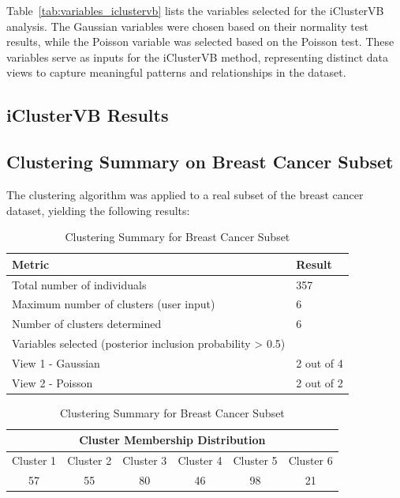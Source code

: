 Table~\ref{tab:variables_iclustervb} lists the variables selected for the iClusterVB analysis. 
The Gaussian variables were chosen based on their normality test results, while the Poisson variable was selected 
based on the Poisson test. These variables serve as inputs for the iClusterVB method, representing distinct data views 
to capture meaningful patterns and relationships in the dataset.


\subsection{iClusterVB Results}

\subsection*{Clustering Summary on Breast Cancer Subset}

The clustering algorithm was applied to a real subset of the breast cancer dataset, yielding the following results:

\begin{table}[!h]
    \centering
    \caption{Clustering Summary for Breast Cancer Subset}
    \label{tab:brca_clustering_summary}
    \begin{tabular}{ll}
    \toprule
    \textbf{Metric} & \textbf{Result} \\
    \midrule
    Total number of individuals & 357 \\
    Maximum number of clusters (user input) & 6 \\
    Number of clusters determined & 6 \\
    \midrule
    Variables selected (posterior inclusion probability > 0.5) & \\
    \quad View 1 - Gaussian & 2 out of 4 \\
    \quad View 2 - Poisson & 2 out of 2 \\
    \bottomrule
\end{tabular}
    
    \vspace{1em}

\begin{tabular}{cccccc}
    \multicolumn{6}{c}{\textbf{Cluster Membership Distribution}} \\
    \toprule
    Cluster 1 & Cluster 2 & Cluster 3 & Cluster 4 & Cluster 5 & Cluster 6 \\
    \midrule
    57 & 55 & 80 & 46 & 98 & 21 \\
    \bottomrule
    \end{tabular}
\end{table}


